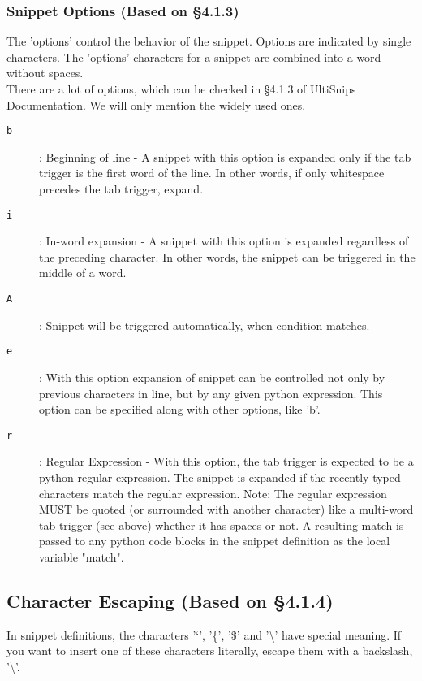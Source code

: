 \documentclass[11pt]{article}
\theoremstyle{plain}%
\theoremstyle{definition}
\theoremstyle{remark}
\begin{document}
	\subsubsection{Snippet Options (Based on \S4.1.3)}	
	The 'options' control the behavior of the snippet. Options are indicated by single characters. The 'options' characters for a snippet are combined into a word without spaces. \\
	There are a lot of options, which can be checked in \S 4.1.3 of UltiSnips Documentation. We will only mention the widely used ones.
	\begin{description}
		\item[\texttt{b}]: Beginning of line - A snippet with this option is expanded only if the tab trigger is the first word of the line. In other words, if only whitespace precedes the tab trigger, expand.  
		\item[\texttt{i}]: In-word expansion - A snippet with this option is expanded regardless of the preceding character. In other words, the snippet can be triggered in the middle of a word.
		\item[\texttt{A}]: Snippet will be triggered automatically, when condition matches.
		\item[\texttt{e}]: With this option expansion of snippet can be controlled not only by previous characters in line, but by any given python expression. This option can be specified along with other options, like 'b'.
		\item[\texttt{r}]: Regular Expression - With this option, the tab trigger is expected to  be a python regular expression. The snippet is expanded if the recently typed characters match the regular expression. Note: The regular expression MUST be quoted (or surrounded with another character) like a multi-word tab trigger (see above) whether it has spaces or not. A resulting match is passed to any python code blocks in the snippet definition as the local variable "match".
	\end{description}
	\subsection{Character Escaping (Based on \S4.1.4)}
	 In snippet definitions, the characters '`', '\{', '\$' and '\textbackslash' have special meaning. If you want to insert one of these characters literally, escape them with a backslash, '\textbackslash'. 
\end{document}
